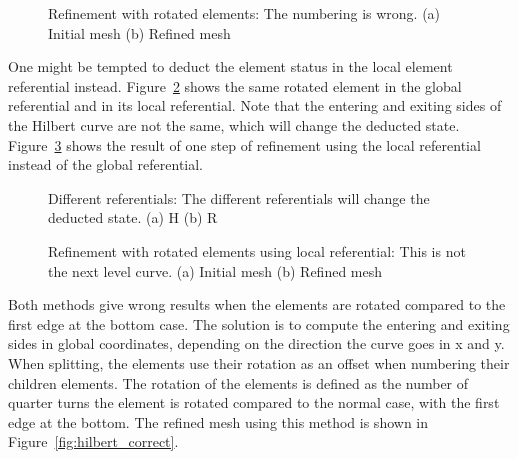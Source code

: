 \begin{figure}[H]
	\centering
	\hfill
	\caption{Refinement with rotated elements: The numbering is wrong. (a) Initial mesh (b) Refined mesh}
	\label{fig:hilbert_rotated}
\end{figure}

One might be tempted to deduct the element status in the local element referential instead.
Figure~\ref{fig:referentials} shows the same rotated element in the global referential and in its
local referential. Note that the entering and exiting sides of the Hilbert curve are not the same,
which will change the deducted state. Figure~\ref{fig:hilbert_local} shows the result of one step of
refinement using the local referential instead of the global referential.

\begin{figure}[H]
	\centering
	\hfill
	\caption{Different referentials: The different referentials will change the deducted state. (a) H (b) R}
	\label{fig:referentials}
\end{figure}

\begin{figure}[H]
	\centering
	\hfill
	\caption{Refinement with rotated elements using local referential: This is not the next level curve. (a) Initial mesh (b) Refined mesh}
	\label{fig:hilbert_local}
\end{figure}

Both methods give wrong results when the elements are rotated compared to the first edge at the
bottom case. The solution is to compute the entering and exiting sides in global coordinates,
depending on the direction the curve goes in x and y. When splitting, the elements use their
rotation as an offset when numbering their children elements. The rotation of the elements is
defined as the number of quarter turns the element is rotated compared to the normal case, with the
first edge at the bottom. The refined mesh using this method is shown in
Figure~\ref{fig:hilbert_correct}.


